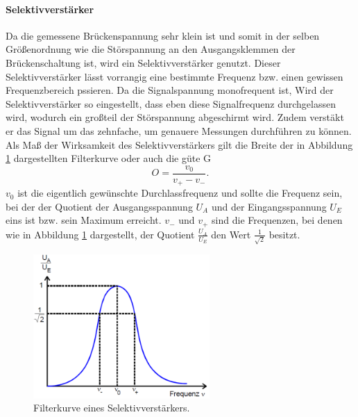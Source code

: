 \paragraph{Selektivverstärker}
Da die gemessene Brückenspannung sehr klein ist und somit in der selben Größenordnung wie die Störspannung an den Ausgangsklemmen der Brückenschaltung ist, 
wird ein Selektivverstärker genutzt. Dieser Selektivverstärker lässt vorrangig eine bestimmte Frequenz bzw. einen  gewissen Frequenzbereich pssieren.
Da die Signalspannung monofrequent ist, Wird der Selektivverstärker so eingestellt, dass eben diese Signalfrequenz durchgelassen wird, wodurch ein großteil der 
Störspannung abgeschirmt wird. Zudem verstäkt er das Signal um das zehnfache, um genauere Messungen durchführen zu können. 
Als Maß der Wirksamkeit des Selektivverstärkers gilt die Breite der in Abbildung \ref{fig:2} dargestellten Filterkurve oder auch die güte G
\begin{equation}
    \label{equ:10}
    O = \frac{v_0}{v_+ - v_-}.
\end{equation}
$v_0$ ist die eigentlich gewünschte Durchlassfrequenz und sollte die Frequenz sein, bei der der Quotient der Ausgangsspannung $U_A$ und der Eingangsspannung $U_E$ 
eins ist bzw. sein Maximum erreicht. $v_-$ und $v_+$ sind die Frequenzen, bei denen wie in Abbildung \ref{fig:2} dargestellt, der Quotient $\frac{U_A}{U_E}$ den Wert $\frac{1}{\sqrt{2}}$ besitzt.
\begin{figure}
    \centering
    \includegraphics[width = 0.60\textwidth]{V606Bild2.png}
    \caption{Filterkurve eines Selektivverstärkers.}
    \label{fig:2}
\end{figure}

